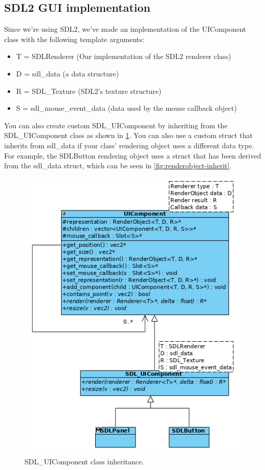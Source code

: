 \subsection{SDL2 GUI implementation}
\label{sec:sdl2gui}

Since we're using SDL2, we've made an implementation of the UIComponent class
 with the following template arguments:
\begin{itemize}
\item T = SDLRenderer (Our implementation of the SDL2 renderer class)
\item D = sdl\_data (a data structure)
\item R = SDL\_Texture (SDL2's texture structure)
\item S = sdl\_mouse\_event\_data (data used by the mouse callback object)
\end{itemize}

You can also create custom SDL\_UIComponent by inheriting from the 
SDL\_UIComponent class as shown in \cref{fig:sdluicomponent-inherit}. You can 
also use a custom struct that inherits from sdl\_data if your class' 
rendering object uses a different data type. For example, the SDLButton 
rendering object uses a struct that has been derived from the sdl\_data 
struct, which can be seen in \cref{fig:renderobject-inherit}.

\begin{figure}[!htb]
\centering
\includegraphics[scale=0.75]{res/ui/sdluicomponent-inherit.png}
\caption{SDL\_UIComponent class inheritance.}\label{fig:sdluicomponent-inherit}
\end{figure}
